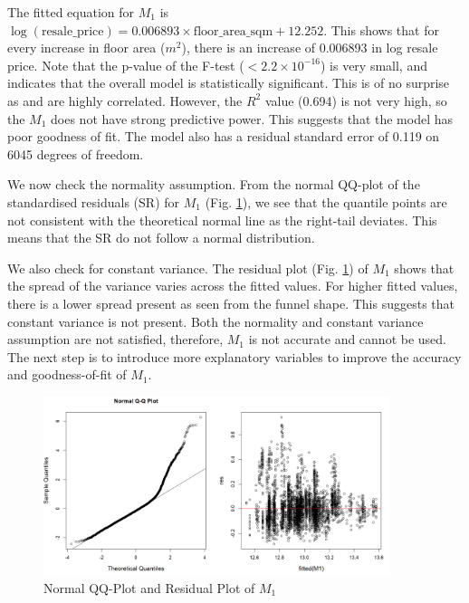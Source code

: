 The fitted equation for $M_1$ is $\log(\text{resale\_price}) = 0.006893 \times \text{floor\_area\_sqm} + 12.252$. This shows that for every increase in floor area ($m^2$), there is an increase of 0.006893 in log resale price. Note that the p-value of the F-test ($< 2.2 \times 10^{-16}$) is very small, and indicates that the overall model is statistically significant. This is of no surprise as  and  are highly correlated. However, the $R^2$ value (0.694) is not very high, so the $M_1$ does not have strong predictive power. This suggests that the model has poor goodness of fit. The model also has a residual standard error of 0.119 on 6045 degrees of freedom.

We now check the normality assumption. From the normal QQ-plot of the standardised residuals (SR) for $M_1$ (Fig. \ref{fig: m1 res plot and qq plot}), we see that the quantile points are not consistent with the theoretical normal line as the right-tail deviates. This means that the SR do not follow a normal distribution. 

We also check for constant variance. The residual plot (Fig. \ref{fig: m1 res plot and qq plot}) of $M_1$ shows that the spread of the variance varies across the fitted values. For higher fitted values, there is a lower spread present as seen from the funnel shape. This suggests that constant variance is not present. Both the normality and constant variance assumption are not satisfied, therefore, $M_1$ is not accurate and cannot be used. The next step is to introduce more explanatory variables to improve the accuracy and goodness-of-fit of $M_1$.

\begin{figure}[!htp]
\centering
    \includegraphics[width=0.9\textwidth]{images/Screenshot 2023-04-11 215131.png}
    \caption{Normal QQ-Plot and Residual Plot of $M_1$}
    \label{fig: m1 res plot and qq plot}
\end{figure}

